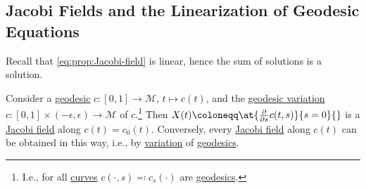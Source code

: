 \subsection{Jacobi Fields and the Linearization of Geodesic Equations}
\begin{prev}
	Recall that \autoref{eq:prop:Jacobi-field} is linear, hence the sum of solutions is a solution.
\end{prev}
\begin{theorem}\label{thm:Jacobi-field-geodesic}
	Consider a \hyperref[def:geodesic]{geodesic} \(c\colon [0, 1] \to \mathcal{M} \), \(t \mapsto c(t)\), and the \hyperref[def:geodesic-variation]{geodesic variation} \(c\colon [0, 1] \times (-\epsilon , \epsilon ) \to \mathcal{M} \) of \(c\).\footnote{I.e., for all \hyperref[def:curve]{curves} \(c(\cdot, s) \eqqcolon c_s(\cdot)\) are \hyperref[def:geodesic]{geodesics}.} Then \(X(t) \coloneqq \at{\frac{\partial }{\partial s} c(t, s)}{s=0}{} \) is a \hyperref[def:Jacobi-field]{Jacobi field} along \(c(t) = c_0(t)\). Conversely, every \hyperref[def:Jacobi-field]{Jacobi field} along \(c(t)\) can be obtained in this way, i.e., by \hyperref[prev:variation]{variation} of \hyperref[def:geodesic]{geodesics}.
\end{theorem}
